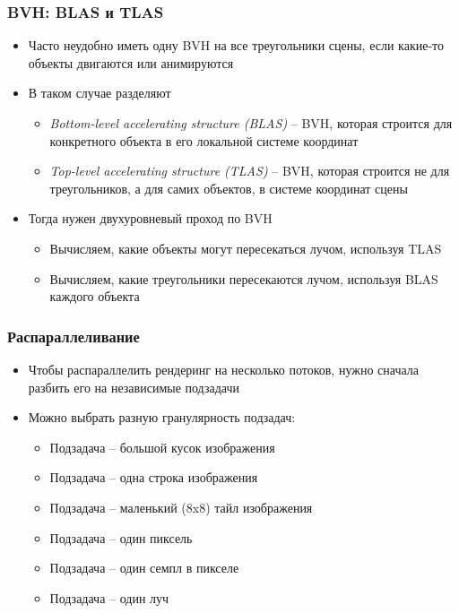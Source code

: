 \documentclass[10pt]{beamer}
\begin{document}
\begin{frame}[fragile]
\frametitle{BVH: BLAS и TLAS}
\begin{itemize}
\item Часто неудобно иметь одну BVH на все треугольники сцены, если какие-то объекты двигаются или анимируются
\pause
\item В таком случае разделяют
\pause
\begin{itemize}
\item \textit{Bottom-level accelerating structure (BLAS)} -- BVH, которая строится для конкретного объекта в его локальной системе координат
\pause
\item \textit{Top-level accelerating structure (TLAS)} -- BVH, которая строится не для треугольников, а для самих объектов, в системе координат сцены
\end{itemize}
\pause
\item Тогда нужен двухуровневый проход по BVH
\pause
\begin{itemize}
\item Вычисляем, какие объекты могут пересекаться лучом, используя TLAS
\pause
\item Вычисляем, какие треугольники пересекаются лучом, используя BLAS каждого объекта
\end{itemize}
\end{itemize}
\end{frame}

\begin{frame}[fragile]
\frametitle{Распараллеливание}
\begin{itemize}
\item Чтобы распараллелить рендеринг на несколько потоков, нужно сначала разбить его на независимые подзадачи
\pause
\item Можно выбрать разную гранулярность подзадач:
\pause
\begin{itemize}
\item Подзадача -- большой кусок изображения
\pause
\item Подзадача -- одна строка изображения
\pause
\item Подзадача -- маленький (8x8) тайл изображения
\pause
\item Подзадача -- один пиксель
\pause
\item Подзадача -- один семпл в пикселе
\pause
\item Подзадача -- один луч
\end{itemize}
\end{itemize}
\end{frame}
\end{document}
